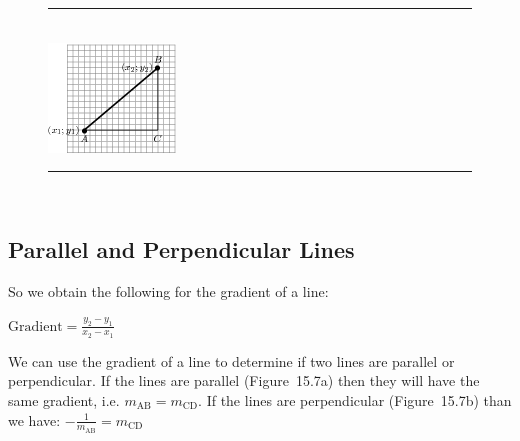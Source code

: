 	\begin{figure}[H] %
    \begin{center}
    \rule[.1in]{\figurerulewidth}{.005in} \\
        \label{m39108*uid42!!!underscore!!!media}\label{m39108*uid42!!!underscore!!!printimage}\includegraphics{col11306.imgs/m39108_MG10C14_018.png} %
        
      \vspace{2pt}
    \vspace{.1in}
    \rule[.1in]{\figurerulewidth}{.005in} \\
        
    \end{center}

 \end{figure}   

    \addtocounter{footnote}{-0}
\subsection{Parallel and Perpendicular Lines}    
        \label{m39108*eip-127}So we obtain the following for the gradient of a line:\par \label{m39108*id68147}\begin{math}\mathrm{Gradient}=\frac{{y}_{2}-{y}_{1}}{{x}_{2}-{x}_{1}}\end{math}\par 
        \label{m39108*eip-332}We can use the gradient of a line to determine if two lines are parallel or perpendicular. If the lines are parallel (Figure~15.7a) then they will have the same gradient, i.e. \begin{math}{m}_{\mathrm{AB}}={m}_{\mathrm{CD}}\end{math}. If the lines are perpendicular (Figure~15.7b) than we have: \begin{math}-\frac{1}{{m}_{\mathrm{AB}}}={m}_{\mathrm{CD}}\end{math}

 
    \setcounter{subfigure}{0}


